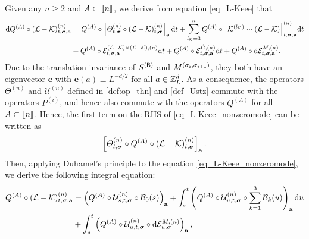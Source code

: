 Given any $n\ge 2$ and $A\subset\llbracket{n}\rrbracket$, we derive from equation \eqref{eq_L-Keee} that 
\begin{align} 
\mathrm{d} Q^{(A)} \circ (\mathcal{L} - \mathcal{K})^{(n)}_{t, {\boldsymbol{\sigma}}, {\mathbf{a}}} 
&= Q^{(A)} \circ \left[\varTheta_{t,{\boldsymbol{\sigma}}}^{(n)} \circ (\mathcal{L} - \mathcal{K})^{(n)}_{t, {\boldsymbol{\sigma}}}\right]_{{\mathbf{a}}} \mathrm{d} t
    + \sum_{l_\mathcal{K}=3}^n Q^{(A)} \circ \Big[{\mathcal K}^{(l_{\mathcal K})}\sim (\mathcal{L} - \mathcal{K})\Big]^{(n)}_{t, {\boldsymbol{\sigma}}, {\mathbf{a}}}\mathrm{d} t \nonumber
    \\
&+ Q^{(A)} \circ \mathcal{E}^{(\mathcal L-\mathcal K)\times(\mathcal L-\mathcal K),(n)}_{t, {\boldsymbol{\sigma}}, {\mathbf{a}}}\mathrm{d} t  + Q^{(A)} \circ \mathcal{E}^{{\mathring G},(n)}_{t, {\boldsymbol{\sigma}}, {\mathbf{a}}} \mathrm{d} t
    + Q^{(A)} \circ \mathrm{d}\mathcal{E}^{M,(n)}_{t, {\boldsymbol{\sigma}}, {\mathbf{a}}} .\label{eq_L-Keee_nonzeromode}
\end{align} 
Due to the translation invariance of $S^{({\mathsf{B}})}$ and $M^{(\sigma_i,\sigma_{i+1})}$, they both have an eigenvector $\mathbf e$ with $\mathbf e(a)\equiv L^{-d/2}$ for all $a\in {\mathbb Z}_L^d$. As a consequence, the operators $\varTheta^{(n)}$ and $\mathcal{U}^{(n)}$ defined in \eqref{def:op_thn} and \eqref{def_Ustz} commute with the operators $P^{(i)}$, and hence also commute with the operators $Q^{(A)}$ for all $A\subset \llbracket{n}\rrbracket$. Hence, the first term on the RHS of \eqref{eq_L-Keee_nonzeromode} can be written as 
\[\left[ \varTheta_{t,{\boldsymbol{\sigma}}}^{(n)} \circ Q^{(A)} \circ (\mathcal{L} - \mathcal{K})^{(n)}_{t, {\boldsymbol{\sigma}}}\right]_{{\mathbf{a}}}.\]
Then, applying Duhamel's principle to the equation \eqref{eq_L-Keee_nonzeromode}, we derive the following integral equation: 
\begin{align}\label{iisuwjyys}
   Q^{(A )}\circ (\mathcal{L} - \mathcal{K})^{(n)}_{t, {\boldsymbol{\sigma}}, {\mathbf{a}}} 
   &=    \left(Q^{(A)}\circ \mathcal{U}^{(n)}_{s, t, {\boldsymbol{\sigma}}} \circ  {\mathcal B}_0(s)\right)_{{\mathbf{a}}} +   \int_{s}^t \left( Q^{(A)}\circ\mathcal{U}^{(n)}_{u, t, {\boldsymbol{\sigma}}} \circ \sum_{k=1}^3{\mathcal B}_k(u) \right)_{{\mathbf{a}}} \mathrm{d} u \nonumber\\
   & +  \int_{s}^t \left(Q^{(A)}\circ\mathcal{U}^{(n)}_{u, t, {\boldsymbol{\sigma}}} \circ   \mathrm{d}\mathcal{E}^{M,(n)}_{u, {\boldsymbol{\sigma}}}\right)_{{\mathbf{a}}} , 
\end{align}
